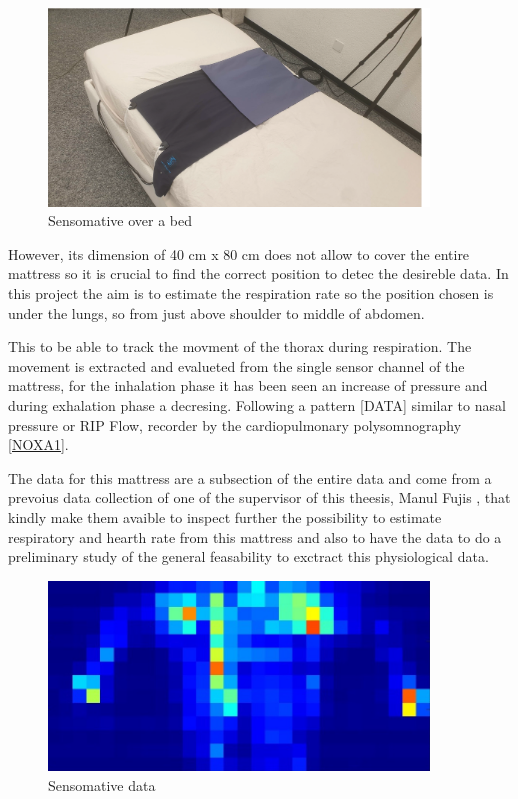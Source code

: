 \vspace*{0.5cm}
\begin{figure}[H]
    \centering
    \includegraphics[width=0.9\textwidth]{img/sensomative.png}
    \caption{Sensomative over a bed}
    \label{fig:sensomativeBed}
\end{figure}
\vspace*{0.5cm}

However, its dimension of 40 cm x 80 cm does not allow to cover the entire mattress so it is crucial to find the correct position to detec the desireble data. In this project the aim is to estimate the respiration rate so the position chosen is under the lungs, so from just above shoulder to middle of abdomen.

This to be able to track the movment of the thorax during respiration. The movement is extracted and evalueted from the single sensor channel of the mattress, for the inhalation phase it has been seen an increase of pressure and during exhalation phase a decresing. Following a pattern [DATA] similar to nasal pressure or RIP Flow, recorder by the cardiopulmonary polysomnography \ref{NOXA1}. 

The data for this mattress are a subsection of the entire data and come from a prevoius data collection of one of the supervisor of this theesis, Manul Fujis \cite{ManuelZurich}, that kindly make them avaible to inspect further the possibility to estimate respiratory and hearth rate from this mattress and also to have the data to do a preliminary study of the general feasability to exctract this physiological data. 
\\ \vspace*{0.5cm}



\begin{figure}[H]
    \centering
    \includegraphics[width=0.9\textwidth]{img/sensomative_2.jpg}
    \caption{Sensomative data}
    \label{fig:sensomativeData}
\end{figure}
\vspace*{0.5cm}

